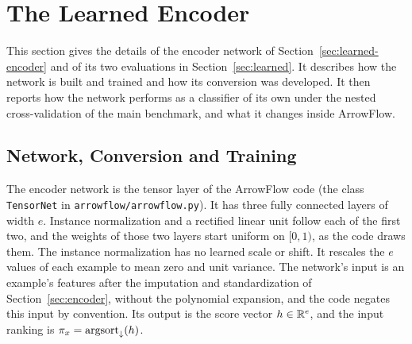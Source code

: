 \section{The Learned Encoder}\label{supp:learned}

This section gives the details of the encoder network of Section~\ref{sec:learned-encoder} and of its two evaluations in Section~\ref{sec:learned}. It describes how the network is built and trained and how its conversion was developed. It then reports how the network performs as a classifier of its own under the nested cross-validation of the main benchmark, and what it changes inside ArrowFlow.

\subsection{Network, Conversion and Training}\label{supp:learned-method}

The encoder network is the tensor layer of the ArrowFlow code (the class \texttt{TensorNet} in \texttt{arrowflow/arrowflow.py}). It has three fully connected layers of width $e$. Instance normalization and a rectified linear unit follow each of the first two, and the weights of those two layers start uniform on $[0,1)$, as the code draws them. The instance normalization has no learned scale or shift. It rescales the $e$ values of each example to mean zero and unit variance. The network's input is an example's features after the imputation and standardization of Section~\ref{sec:encoder}, without the polynomial expansion, and the code negates this input by convention. Its output is the score vector $h\in\mathbb{R}^e$, and the input ranking is $\pi_x=\mathrm{argsort}_{\downarrow}(h)$.

